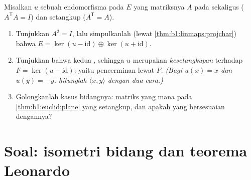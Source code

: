 \begin{exercise}[$\star\star\star$]\label{exo:b1:euclid:12}
Misalkan $u$ sebuah endomorfisma pada  $E$ yang matriksnya
$A$ pada   sekaligus  ($A^{\mathsf T}A
= I$) dan setangkup ($A^{\mathsf T} = A$).
\begin{enumerate}
  \item Tunjukkan $A^2 = I$, lalu simpulkanlah (lewat
        \cref{thm:b1:linmaps:projchar}) bahwa $E = \ker(u -
        \mathrm{id}) \oplus \ker(u + \mathrm{id})$.
  \item Tunjukkan bahwa kedua  , sehingga $u$
        merupakan \emph{kesetangkupan } terhadap $F =
        \ker(u - \mathrm{id})$: yaitu pencerminan lewat $F$.
        \emph{(Bagi $u(x) = x$ dan $u(y) = -y$, hitunglah $\langle
        x, y\rangle$ dengan dua cara.)}
  \item Golongkanlah kasus bidangnya: matriks yang mana pada
        \cref{thm:b1:euclid:plane} yang setangkup, dan apakah
         yang bersesuaian dengannya?
\end{enumerate}
\end{exercise}

\section{Soal: isometri bidang dan teorema Leonardo}

